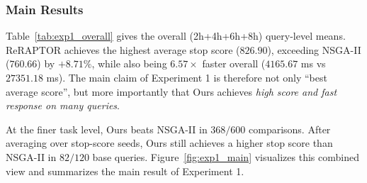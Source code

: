 \subsubsection{Main Results}
Table~\ref{tab:exp1_overall} gives the overall (2h+4h+6h+8h) query-level means.
ReRAPTOR achieves the highest average stop score (\(826.90\)),
exceeding NSGA-II (\(760.66\)) by \(+8.71\%\),
while also being \(6.57\times\) faster overall
(\(4165.67\) ms vs \(27351.18\) ms).
The main claim of Experiment 1 is therefore not only ``best average score'',
but more importantly that Ours achieves \emph{high score and fast response on many queries}.

\begin{table}[t]
    \centering
    \caption{Overall summary of Experiment 1 (query-level means, 120 queries).}
    \label{tab:exp1_overall}
\end{table}

At the finer task level,
Ours beats NSGA-II in \(368/600\) comparisons.
After averaging over stop-score seeds, Ours still achieves a higher stop score
than NSGA-II in \(82/120\) base queries.
Figure~\ref{fig:exp1_main} visualizes this combined view and summarizes the
main result of Experiment 1.

